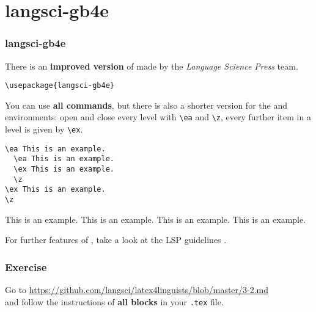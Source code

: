 \section{langsci-gb4e}

\begin{frame}[fragile]
\frametitle{langsci-gb4e}

There is an \textbf{improved version} of  made by the \emph{Language Science Press} team.

\begin{lstlisting}
\usepackage{langsci-gb4e}
\end{lstlisting}

You can use \textbf{all  commands}, but there is also a shorter version for the  and  environments: open and close every level with \lstinline|\ea| and \lstinline|\z|, every further item in a level is given by \lstinline|\ex|. 

\begin{multicols}{2}
	
\begin{lstlisting}
\ea This is an example. 
  \ea This is an example.
  \ex This is an example. 
  \z		
\ex This is an example.
\z 
\end{lstlisting}

\ea This is an example. 
\ea This is an example.
\ex This is an example. 
\z		
\ex This is an example.
\z 

\end{multicols}

For further features of , take a look at the LSP guidelines \citep{Nordhoff&Co}.


\end{frame}


\begin{frame}[fragile]
\frametitle{Exercise}


Go to \url{https://github.com/langsci/latex4linguists/blob/master/3-2.md}\\
and follow the instructions of \textbf{all blocks} in your \texttt{.tex} file.


\end{frame}


